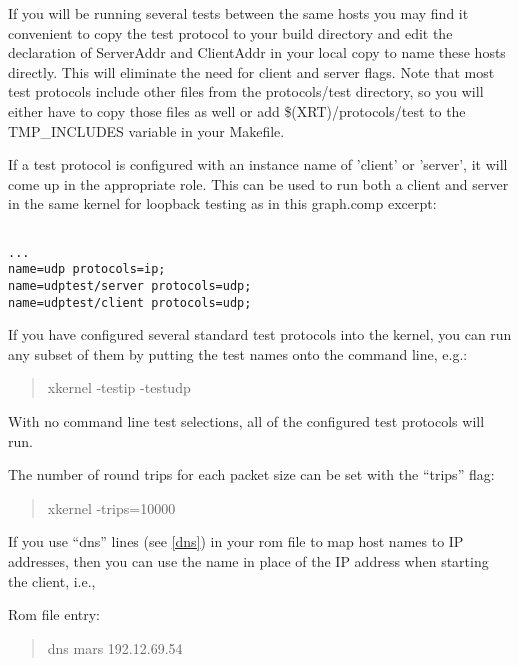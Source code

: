 If you will be running several tests between the same hosts you may
find it convenient to copy the test protocol to your build directory
and edit the declaration of ServerAddr and ClientAddr in your local
copy to name these hosts directly.  
This will eliminate the need for client and server flags.  Note
that most test protocols include other files from the {\sanss
protocols/test} directory, so you will either have to copy those files
as well or add {\sanss \$(XRT)/protocols/test} to the 
{\sanss TMP\_INCLUDES} variable in your Makefile.

If a test protocol is configured with an instance name of 'client' or
'server', it will come up in the appropriate role.  This can be used
to run both a client and server in the same kernel for loopback
testing as in this graph.comp excerpt:

\begin{verbatim}

...
name=udp protocols=ip;
name=udptest/server protocols=udp;
name=udptest/client protocols=udp;

\end{verbatim}

If you have configured several standard test protocols into the
kernel, you can run any subset of them by putting the test names onto
the command line, e.g.:

\begin{quote}
\begin{tt}
xkernel -testip -testudp
\end{tt}
\end{quote}

\noindent
With no command line test selections, all of the configured test protocols
will run.

The number of round trips for each packet size can be set with the
``trips'' flag:

\begin{quote}
\begin{tt}
xkernel -trips=10000
\end{tt}
\end{quote}


If you use ``dns'' lines (see \ref{dns}) in your rom file to map host
names to IP addresses, then you can use the name in place of the IP
address when starting the client, i.e.,

Rom file entry:
\begin{quote}
\begin{tt}
dns mars 192.12.69.54
\end{tt}
\end{quote}


